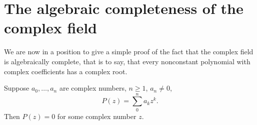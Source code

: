 \section{The algebraic completeness of the complex field}
We are now in a position to give a simple proof of the fact that the complex
field is algebraically complete, 
that is to say, that every nonconstant polynomial
with complex coefficients has a complex root.

\begin{thm}
    \label{thm:8.8}
    Suppose $a_0,\dots,a_n$ are complex numbers, $n \geq 1$, $a_n \neq 0$,
    \begin{equation*}
        P(z) = \sum_{0}^{n} a_k z^k.
    \end{equation*}
    Then $P(z) = 0$  for some complex number $z$.
\end{thm}

